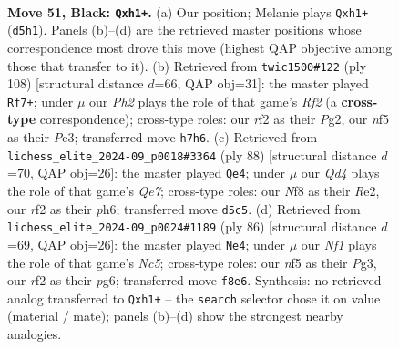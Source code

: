 \documentclass[11pt]{article}
\begin{document}
\clearpage

\begin{figure}[p]\centering
\begin{subfigure}{0.46\textwidth}\centering
\resizebox{\linewidth}{!}{%
\newchessgame
\chessboard[
  setfen={2r2nk1/1p2Q2p/8/3q1N1p/8/8/5R1K/7R b - - 15 51},
  showmover=false,
  pgfstyle=straightmove, color=movearrow, markmove={d5-h1}
]}
\caption{}
\end{subfigure}\hfill
\begin{subfigure}{0.46\textwidth}\centering
\resizebox{\linewidth}{!}{%
\newchessgame
\chessboard[
  setfen={6Q1/4k1n1/1p2r3/4q3/8/4P2P/5RP1/6K1 w - - 0 55},
  showmover=false,
  pgfstyle=straightmove, color=movearrow, markmove={f2-f7}
]}
\caption{}
\end{subfigure}
\\[4pt]
\begin{subfigure}{0.46\textwidth}\centering
\resizebox{\linewidth}{!}{%
\newchessgame
\chessboard[
  setfen={5r1k/4Q1p1/7p/8/8/5q1P/P3R2K/8 w - - 8 45},
  showmover=false,
  pgfstyle=straightmove, color=movearrow, markmove={e7-e4}
]}
\caption{}
\end{subfigure}\hfill
\begin{subfigure}{0.46\textwidth}\centering
\resizebox{\linewidth}{!}{%
\newchessgame
\chessboard[
  setfen={3r1b1k/8/6pp/2Nq4/6b1/1P4P1/5P2/2Q1R1K1 w - - 3 44},
  showmover=false,
  pgfstyle=straightmove, color=movearrow, markmove={c5-e4}
]}
\caption{}
\end{subfigure}
\caption{\textbf{Move 51, Black: \texttt{Qxh1+}.} (a) Our position; Melanie plays \texttt{Qxh1+} (\texttt{d5h1}). Panels (b)--(d) are the retrieved master positions whose correspondence most drove this move (highest QAP objective among those that transfer to it). (b) Retrieved from \texttt{twic1500\#122} (ply 108) [structural distance $d$=66, QAP obj=31]: the master played \texttt{Rf7+}; under $\mu$ our \emph{Ph2} plays the role of that game's \emph{Rf2} (a \textbf{cross-type} correspondence); cross-type roles: our \emph{r}f2 as their \emph{P}g2, our \emph{n}f5 as their \emph{P}e3; transferred move \texttt{h7h6}. (c) Retrieved from \texttt{lichess\_elite\_2024-09\_p0018\#3364} (ply 88) [structural distance $d$=70, QAP obj=26]: the master played \texttt{Qe4}; under $\mu$ our \emph{Qd4} plays the role of that game's \emph{Qe7}; cross-type roles: our \emph{N}f8 as their \emph{R}e2, our \emph{r}f2 as their \emph{p}h6; transferred move \texttt{d5c5}. (d) Retrieved from \texttt{lichess\_elite\_2024-09\_p0024\#1189} (ply 86) [structural distance $d$=69, QAP obj=26]: the master played \texttt{Ne4}; under $\mu$ our \emph{Nf1} plays the role of that game's \emph{Nc5}; cross-type roles: our \emph{n}f5 as their \emph{P}g3, our \emph{r}f2 as their \emph{p}g6; transferred move \texttt{f8e6}. Synthesis: no retrieved analog transferred to \texttt{Qxh1+} -- the \texttt{search} selector chose it on value (material / mate); panels (b)--(d) show the strongest nearby analogies.}
\label{fig:thought-m101}
\end{figure}
\end{document}
